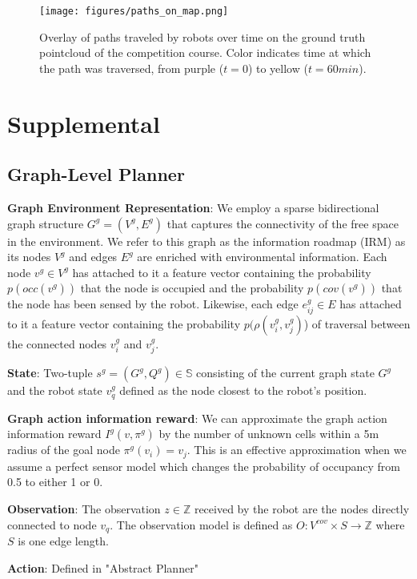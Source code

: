 \documentclass{article}
\newcommand{\ph}[1]{{\textbf{#1}:}} %
\begin{document}
\begin{figure}[ht!]
  \texttt{[image: figures/paths\_on\_map.png]}
  \centering
  \caption{Overlay of paths traveled by robots over time on the ground truth pointcloud of the competition course.  Color indicates time at which the path was traversed, from purple ($t=0$) to yellow ($t=60min$).}
  \label{fig:paths_on_map}
\end{figure}


\section{Supplemental}


\subsection{Graph-Level Planner} 


\ph{Graph Environment Representation} We employ a sparse bidirectional graph structure $G^g = (V^g, E^g)$ that captures the connectivity of the free space in the environment. We refer to this graph as the information roadmap (IRM) as its nodes $V^g$ and edges $E^g$ are enriched with environmental information. Each node $v^g \in V^g$ has attached to it a feature vector containing the probability $p(occ(v^g))$ that the node is occupied and the probability $p(cov(v^g))$ that the node has been sensed by the robot. Likewise, each edge $e_{ij}^g \in E$ has attached to it a feature vector containing the probability $p(\rho(v_i^g, v_j^g)$) of traversal between the connected nodes $v_i^g$ and $v_j^g$.

\ph{State} Two-tuple $s^g=(G^g, Q^g) \in \mathbb{S}$ consisting of the current graph state $G^g$ and the robot state $v_q^g$ defined as the node closest to the robot's position. 

\ph{Graph action information reward}
We can approximate the graph action information reward $I^g(v, \pi^g)$ by the number of unknown cells within a 5m radius of the goal node $\pi^g(v_i)=v_j$.  This is an effective approximation when we assume a perfect sensor model which changes the probability of occupancy from 0.5 to either 1 or 0.  

\ph{Observation} The observation $z \in \mathbb{Z}$ received by the robot are the nodes directly connected to node $v_q$. The observation model is defined as $O: V^{cov} \times S \rightarrow \mathbb{Z}$ where $S$ is one edge length.

\ph{Action} Defined in "Abstract Planner"
\end{document}
